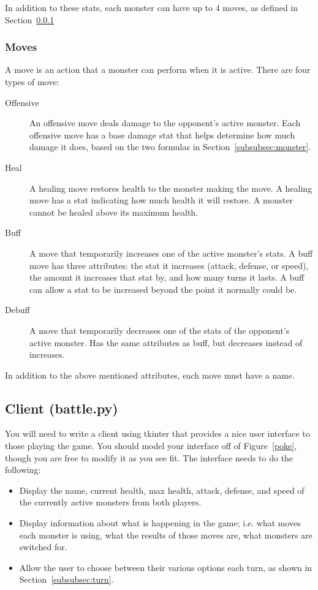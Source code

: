 \documentclass[11pt]{cselabheader}
\begin{document}
In addition to these stats, each monster can have up to 4 moves, as defined in
Section~\ref{subsubsec:moves}

\subsubsection{Moves}
\label{subsubsec:moves}
A move is an action that a monster can perform when it is active. There are four
types of move:

\begin{description}
\item[Offensive] An offensive move deals damage to the opponent's active
  monster.  Each offensive move has a base damage stat that helps determine how
  much damage it does, based on the two formulas in
  Section~\ref{subsubsec:monster}.

\item[Heal] A healing move restores health to the monster making the move. A
  healing move has a stat indicating how much health it will restore. A monster
  cannot be healed above its maximum health.

\item[Buff] A move that temporarily increases one of the active monster's stats.
  A buff move has three attributes: the stat it increases (attack, defense, or
  speed), the amount it increases that stat by, and how many turns it lasts. A
  buff can allow a stat to be increased beyond the point it normally could be.

\item[Debuff] A move that temporarily decreases one of the stats of the
  opponent's active monster. Has the same attributes as buff, but decreases
  instead of increases.
\end{description}

In addition to the above mentioned attributes, each move must have a name.

\subsection{Client (battle.py)}
You will need to write a client using tkinter that provides a nice user
interface to those playing the game. You should model your interface off of
Figure~\ref{poke}, though you are free to modify it as you see fit. The
interface needs to do the following:

\begin{itemize}
\item Display the name, current health, max health, attack, defense, and speed
  of the currently active monsters from both players.
\item Display information about what is happening in the game; i.e. what
  moves each monster is using, what the results of those moves are, what
  monsters are switched for.
\item Allow the user to choose between their various options each turn, as shown
  in Section~\ref{subsubsec:turn}.
\end{itemize}
\end{document}
